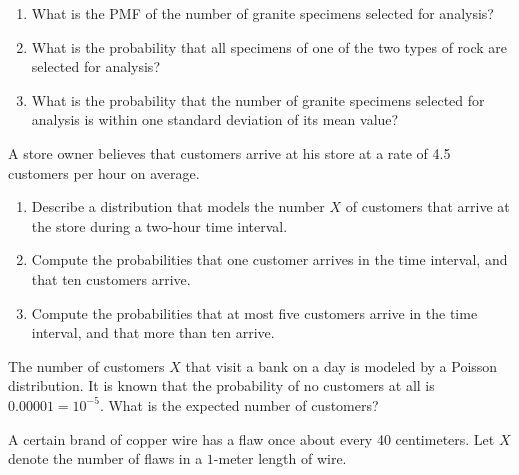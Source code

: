 \documentclass[12pt,reqno]{amsart}
\begin{document}
\medskip
\begin{enumerate}
\item What is the PMF of the number of granite specimens selected for analysis?\vfill
\item What is the probability that all specimens of one of the two types of rock are selected for analysis?\vfill
\item What is the probability that the number of granite specimens selected for analysis is within one standard deviation of its mean value?\vfill
\end{enumerate}


















\newpage
\prob A store owner believes that customers arrive at his store at a rate of 4.5 customers per hour on average.

\medskip
\begin{enumerate}
\item Describe a distribution that models the number $X$ of customers that arrive at the store during a two-hour time interval.\vfill
\item Compute the probabilities that one customer arrives in the time interval, and that ten customers arrive.\vfill
\item Compute the probabilities that at most five customers arrive in the time interval, and that more than ten arrive.\vfill
\end{enumerate}













\bigskip
\prob The number of customers $X$ that visit a bank on a day is modeled by a Poisson distribution. It is known that the probability of no customers at all is $0.00001 = 10^{-5}$. What is the expected number of customers?\vfill













\bigskip
\prob A certain brand of copper wire has a flaw once about every 40 centimeters. Let $X$ denote the number of flaws in a $1$-meter length of wire.
\end{document}
